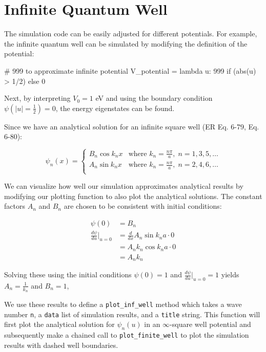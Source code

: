 \documentclass{article}
\begin{document}
\section{Infinite Quantum Well}\label{sec:InfWell}

The simulation code can be easily adjusted for different potentials. For
example, the infinite quantum well can be simulated by modifying the definition
of the potential:

\begin{sageblock}
# 999 to approximate infinite potential
V_potential = lambda u: 999 if (abs(u) > 1/2) else 0
\end{sageblock}

Next, by interpreting $V_0 = 1$ eV and using the boundary condition
$\psi(\text{\(\lvert u\rvert\)}=\frac{1}{2}) = 0$, the energy eigenstates can be found.

Since we have an analytical solution for an infinite square well (ER Eq. 6-79,
Eq. 6-80):

\begin{equation}
    \psi_n(x) = 
    \begin{cases}
        B_n \cos k_n x &\text{where } k_n = \frac{n\pi}{a},\; n = 1,3,5,\ldots\\
        A_n \sin k_n x &\text{where } k_n = \frac{n\pi}{a},\; n = 2,4,6,\ldots\\
    \end{cases}
\end{equation}

We can visualize how well our simulation approximates analytical results by modifying our
plotting function to also plot the analytical solutions. The constant factors $A_n$ and $B_n$
are chosen to be consistent with initial conditions:

\begin{align}
    \psi(0) &= B_n \\
    \frac{d\psi}{du}\bigg|_{u=0} &= \frac{d}{dx}A_n \sin k_n a\cdot0 \nonumber \\
                        &= A_n k_n \cos k_n a\cdot0 \nonumber \\
                        &= A_n k_n
\end{align}

Solving these using the initial conditions $\psi(0)=1$ and
$\frac{d\psi}{du}\big|_{u=0}=1$ yields $A_n = \frac{1}{k_n}$ and $B_n = 1$,

We use these results to define a \texttt{plot\_inf\_well} method which
takes a wave number \texttt{n}, a \texttt{data} list of simulation results,
and a \texttt{title} string.  This function will first plot the analytical
solution for $\psi_n(u)$ in an $\infty$-square well potential and subsequently
make a chained call to \texttt{plot\_finite\_well} to plot the simulation
results with dashed well boundaries.
\end{document}
